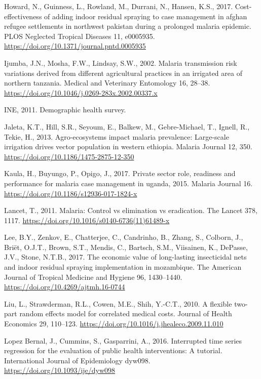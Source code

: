 \documentclass[]{article}
\begin{document}
\hypertarget{ref-Howard_2017}{}
Howard, N., Guinness, L., Rowland, M., Durrani, N., Hansen, K.S., 2017.
Cost-effectiveness of adding indoor residual spraying to case management
in afghan refugee settlements in northwest pakistan during a prolonged
malaria epidemic. PLOS Neglected Tropical Diseases 11, e0005935.
\url{https://doi.org/10.1371/journal.pntd.0005935}

\hypertarget{ref-Ijumba2002}{}
Ijumba, J.N., Mosha, F.W., Lindsay, S.W., 2002. Malaria transmission
risk variations derived from different agricultural practices in an
irrigated area of northern tanzania. Medical and Veterinary Entomology
16, 28--38. \url{https://doi.org/10.1046/j.0269-283x.2002.00337.x}

\hypertarget{ref-estatistica2009}{}
INE, 2011. Demographic health survey.

\hypertarget{ref-Jaleta2013}{}
Jaleta, K.T., Hill, S.R., Seyoum, E., Balkew, M., Gebre-Michael, T.,
Ignell, R., Tekie, H., 2013. Agro-ecosystems impact malaria prevalence:
Large-scale irrigation drives vector population in western ethiopia.
Malaria Journal 12, 350. \url{https://doi.org/10.1186/1475-2875-12-350}

\hypertarget{ref-Kaula_2017}{}
Kaula, H., Buyungo, P., Opigo, J., 2017. Private sector role, readiness
and performance for malaria case management in uganda, 2015. Malaria
Journal 16. \url{https://doi.org/10.1186/s12936-017-1824-x}

\hypertarget{ref-TheLancet2011}{}
Lancet, T., 2011. Malaria: Control vs elimination vs eradication. The
Lancet 378, 1117. \url{https://doi.org/10.1016/s0140-6736(11)61489-x}

\hypertarget{ref-Lee2017}{}
Lee, B.Y., Zenkov, E., Chatterjee, C., Candrinho, B., Zhang, S.,
Colborn, J., Briët, O.J.T., Brown, S.T., Mendis, C., Bartsch, S.M.,
Viisainen, K., DePasse, J.V., Stone, N.T.B., 2017. The economic value of
long-lasting insecticidal nets and indoor residual spraying
implementation in mozambique. The American Journal of Tropical Medicine
and Hygiene 96, 1430--1440. \url{https://doi.org/10.4269/ajtmh.16-0744}

\hypertarget{ref-Liu2010}{}
Liu, L., Strawderman, R.L., Cowen, M.E., Shih, Y.-C.T., 2010. A flexible
two-part random effects model for correlated medical costs. Journal of
Health Economics 29, 110--123.
\url{https://doi.org/10.1016/j.jhealeco.2009.11.010}

\hypertarget{ref-Lopez_Bernal_2016}{}
Lopez Bernal, J., Cummins, S., Gasparrini, A., 2016. Interrupted time
series regression for the evaluation of public health interventions: A
tutorial. International Journal of Epidemiology dyw098.
\url{https://doi.org/10.1093/ije/dyw098}
\end{document}
